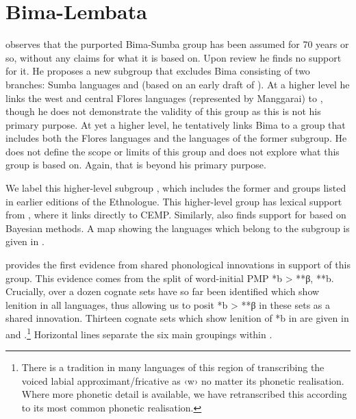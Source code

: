 \chapter{Bima-Lembata}\label{ch:BL}
\citet{Blust2008} observes that the purported Bima-Sumba group
has been assumed for 70 years or so,
without any claims for what it is based on.
Upon review he finds no support for it.
He proposes a new  subgroup that excludes Bima
consisting of two branches: Sumba languages
and  (based on an early draft of \citealt{Grimes2010a}).
At a higher level he links the west
and central Flores languages (represented by Manggarai)
to , though he does not demonstrate the validity of this group as
this is not his primary purpose.
At yet a higher level,
he tentatively links Bima to a group that includes both the Flores
languages and the languages of the former  subgroup.
He does not define the scope or limits of this group
and does not explore what this group is based on.
Again, that is beyond his primary purpose.

We label this higher-level subgroup ,
which includes the former 
and  groups listed in earlier editions of the Ethnologue.
This higher-level group has lexical support from \cite{GrayGreenhill2009},
where it links directly to CEMP.
Similarly, \citet{Gasser2014b} also finds support for 
based on Bayesian methods.
A map showing the languages which belong to
the  subgroup is given in .

\citet[299ff]{Fricke2019} provides the first evidence from shared phonological
innovations in support of this group.
This evidence comes from the split of word-initial PMP *b > **β, **b.
Crucially, over a dozen cognate sets have so far been identified
which show lenition in all  languages,
thus allowing us to posit *b > **β in these sets as a shared innovation.
Thirteen cognate sets which show lenition of *b in 
are given in 
and .\footnote{
		There is a tradition in many languages
		of this region of transcribing the voiced labial approximant/fricative
		as ‹w› no matter its phonetic realisation.
		Where more phonetic detail is available,
		we have retranscribed this according to its most common phonetic
		realisation.}
Horizontal lines separate the six main groupings within .

